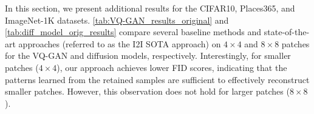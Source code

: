 In this section, we present additional results for the CIFAR10, Places365, and ImageNet-1K datasets. \cref{tab:VQ-GAN_results_original} and \cref{tab:diff_model_orig_results} compare several baseline methods and state-of-the-art approaches (referred to as the I2I SOTA approach) on $4\times4$ and $8\times8$ patches for the VQ-GAN and diffusion models, respectively. Interestingly, for smaller patches ($4\times4$), our approach achieves lower FID scores, indicating that the patterns learned from the retained samples are sufficient to effectively reconstruct smaller patches. However, this observation does not hold for larger patches ($8\times8$).